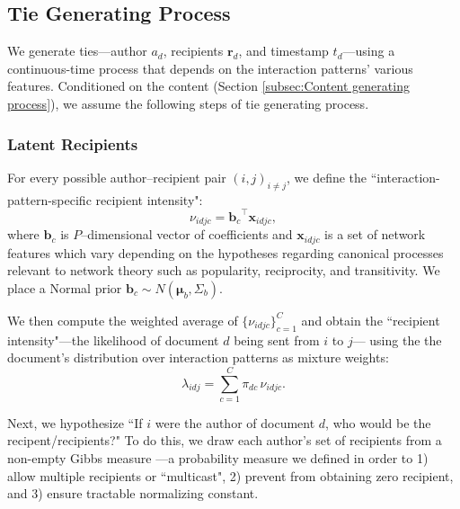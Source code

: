 \documentclass{article}
\begin{document}
\subsection{Tie Generating Process}\label{subsec:Tie generating process}
We generate ties---author $a_d$, recipients $\boldsymbol{r}_d$, and timestamp $t_d$---using a continuous-time process
that depends on the interaction patterns' various features. Conditioned on the content (Section \ref{subsec:Content generating process}), we assume the following steps of tie generating process.

\subsubsection{Latent Recipients}\label{subsubsec:Hypothetical Recipients}
For every possible author--recipient pair $(i,j)_{i \neq j}$, we define the ``interaction-pattern-specific recipient intensity":
\begin{equation}
\nu_{idjc} = {\boldsymbol{b}_c}^{\top}\boldsymbol{x}_{idjc},
\end{equation}
where $\boldsymbol{b}_c$ is $P$--dimensional vector of coefficients and $\boldsymbol{x}_{idjc}$ is a set of network features which vary depending on the hypotheses regarding canonical processes relevant to network theory such as popularity, reciprocity, and transitivity. We place a Normal prior $\boldsymbol{b}_c \sim N(\boldsymbol{\mu}_b,\Sigma_b)$.

We then compute the weighted average of $\{\nu_{idjc}\}_{c=1}^C$ and obtain the ``recipient intensity"---the likelihood of document $d$ being sent from $i$ to $j$--- using the the document's distribution over interaction patterns as mixture weights:
\begin{equation}
\lambda_{idj} =\sum_{c=1}^{C} \pi_{dc}\, \nu_{idjc}.
\end{equation}

Next, we hypothesize ``If $i$ were the
author of document $d$, who would be the recipent/recipients?" To do this, we draw each author's set of recipients from a non-empty Gibbs measure \cite{fellows2017removing}---a probability measure we defined in order to 1) allow multiple recipients or ``multicast", 2) prevent from obtaining zero recipient, and 3) ensure tractable normalizing constant. 
\end{document}
